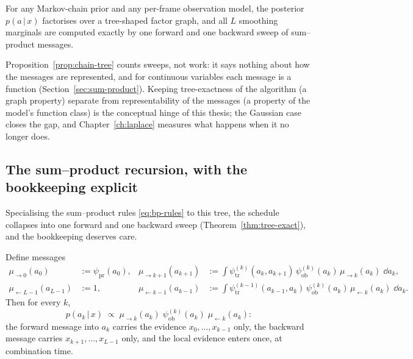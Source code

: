 \begin{proposition}\label{prop:chain-tree}
For any Markov-chain prior and any per-frame observation model, the
posterior $p(a \,|\, x)$ factorises over a tree-shaped factor graph, and
all $L$ smoothing marginals are computed exactly by one forward and one
backward sweep of sum--product messages.
\end{proposition}

Proposition~\ref{prop:chain-tree} counts sweeps, not work: it says
nothing about how the messages are represented, and for continuous
variables each message is a function
(Section~\ref{sec:sum-product}). Keeping tree-exactness of the
algorithm (a graph property) separate from representability of the
messages (a property of the model's function class) is the conceptual
hinge of this thesis; the Gaussian case closes the gap, and
Chapter~\ref{ch:laplace} measures what happens when it no longer does.

\subsection{The sum--product recursion, with the bookkeeping explicit}

Specialising the sum--product rules \eqref{eq:bp-rules} to this tree,
the schedule collapses into one forward and one backward sweep
(Theorem~\ref{thm:tree-exact}), and the bookkeeping deserves care.

\begin{proposition}\label{prop:bp-convA}
Define messages
\begin{align}
  \mu_{\to 0}(a_0) &:= \psi_{\mathrm{pr}}(a_0),
  &
  \mu_{\to k+1}(a_{k+1}) &:= \int
    \psi^{(k)}_{\mathrm{tr}}(a_k, a_{k+1})\,
    \psi^{(k)}_{\mathrm{ob}}(a_k)\,
    \mu_{\to k}(a_k)\; \dd a_k ,
  \label{eq:bp-fwd}\\
  \mu_{\leftarrow L-1}(a_{L-1}) &:= 1,
  &
  \mu_{\leftarrow k-1}(a_{k-1}) &:= \int
    \psi^{(k-1)}_{\mathrm{tr}}(a_{k-1}, a_k)\,
    \psi^{(k)}_{\mathrm{ob}}(a_k)\,
    \mu_{\leftarrow k}(a_k)\; \dd a_k .
  \label{eq:bp-bwd}
\end{align}
Then for every $k$,
\begin{equation}
  p(a_k \,|\, x) \;\propto\;
  \mu_{\to k}(a_k)\;
  \psi^{(k)}_{\mathrm{ob}}(a_k)\;
  \mu_{\leftarrow k}(a_k) :
  \label{eq:bp-combine}
\end{equation}
the forward message into $a_k$ carries the evidence
$x_0, \dots, x_{k-1}$ only, the backward message carries
$x_{k+1}, \dots, x_{L-1}$ only, and the local evidence enters once, at
combination time.
\end{proposition}

